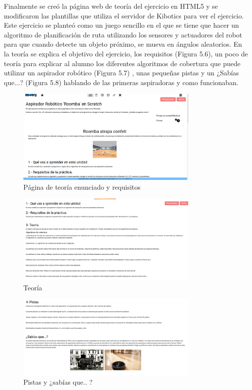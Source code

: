 Finalmente se creó la página web de teoría del ejercicio en HTML5 y se modificaron las plantillas que utiliza el servidor de Kibotics para ver el ejercicio. Este ejercicio se planteó como un juego sencillo en el que se tiene que hacer un algoritmo de planificación de ruta utilizando los sensores y actuadores del robot  para que cuando detecte un objeto próximo, se mueva en ángulos aleatorios. 
En la teoría se explica el objetivo del ejercicio, los requisitos (Figura 5.6), un poco de teoría para explicar al alumno los diferentes algoritmos de cobertura que puede utilizar un aspirador robótico (Figura  5.7) , unas pequeñas pistas y un ¿Sabías que...? (Figura 5.8) hablando de las primeras aspiradoras y como funcionaban. 


\begin{figure}[H]
    \centering
    \includegraphics[width=0.8\textwidth, height=0.4\textwidth]{chapters/images/teoria1.png}
    \caption{Página de teoría enunciado y requisitos}
    \label{fig:my_label}
\end{figure}
\begin{figure}[H]
    \centering
    \includegraphics[width=0.8\textwidth, height=0.4\textwidth]{chapters/images/teoria2.png}
    \caption{Teoría}
    \label{fig:my_label}
\end{figure}
\begin{figure}[H]
    \centering
    \includegraphics[width=0.8\textwidth, height=0.4\textwidth]{chapters/images/teoria3.png}
    \caption{Pistas y ¿sabías que.. ?}
    \label{fig:my_label}
\end{figure}


